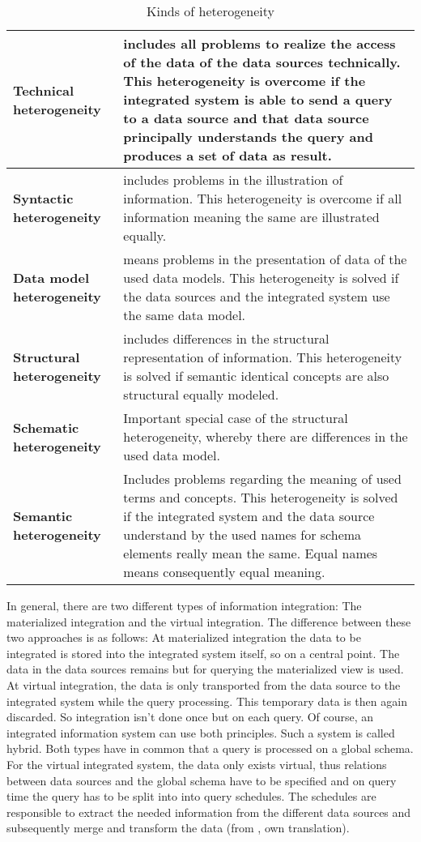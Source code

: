\begin{table}[]
\centering
\begin{tabular}{|l|p{}|}
\hline
 \textbf{Technical  heterogeneity}  &  includes all problems to realize the access of the data of the data sources technically. This heterogeneity is overcome if the integrated system is able to send a query to a data source and that data source principally understands the query and produces a set of data as result.\\ \hline
 \textbf{Syntactic  heterogeneity}    &  includes problems in the illustration of information. This heterogeneity is overcome if all information meaning the same are illustrated equally.\\ \hline
 \textbf{Data model  heterogeneity} &  means problems in the presentation of data of the used data models. This heterogeneity is solved if the data sources and the integrated system use the same data model.\\ \hline
 \textbf{Structural  heterogeneity}    &  includes differences in the structural representation of information. This heterogeneity is solved if semantic identical concepts are also structural equally modeled. \\ \hline
 \textbf{Schematic  heterogeneity} &  Important special case of the structural heterogeneity, whereby there are differences in the used data model.\\ \hline
 \textbf{Semantic  heterogeneity}    &  Includes problems regarding the meaning of used terms and concepts. This heterogeneity is solved if the integrated system and the data source understand by the used names for schema elements really mean the same. Equal names means consequently equal meaning.\\ \hline
\end{tabular}
\caption{Kinds of heterogeneity}
\label{kinds-of-heterogeneity}
\end{table}

In general, there are two different types of information integration: The materialized integration and the virtual integration. The difference between these two approaches is as follows: At materialized integration the data to be integrated is stored  into the integrated system itself, so on a central point. The data in the data sources remains but for querying the materialized view is used. At virtual integration, the data is only transported from the data source to the integrated system while the query processing. This temporary data is then again discarded. So integration isn't done once but on each query. Of course, an integrated information system can use both principles. Such a system is called hybrid. Both types have in common that a query is processed on a global schema. For the virtual integrated system, the data only exists virtual, thus relations between data sources and the global schema have to be specified and on query time the query has to be split into into query schedules. The schedules are responsible to extract the needed information from the different data sources and subsequently merge and transform the data (from \cite[p. 86-88]{DBLP:books/dp/LeserN2006}, own translation).

